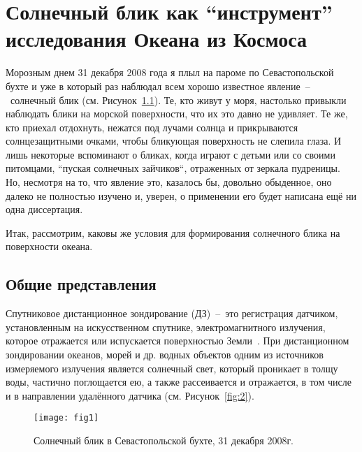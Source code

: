 \chapter{Солнечный блик как ``инструмент'' исследования Океана из Космоса} \label{chap:1}

Морозным днем 31 декабря 2008 года я плыл на пароме по Севастопольской бухте и уже в который раз наблюдал всем хорошо известное явление~--~солнечный блик (см. Рисунок~\ref{fig:1}). Те, кто живут у моря, настолько привыкли наблюдать блики на морской поверхности, что их это давно не удивляет. Те же, кто приехал отдохнуть, нежатся под лучами солнца и прикрываются солнцезащитными очками, чтобы бликующая поверхность не слепила глаза. И лишь некоторые вспоминают о бликах, когда играют с детьми или со своими питомцами, ``пуская солнечных зайчиков``, отраженных от зеркала пудреницы. Но, несмотря на то, что явление это, казалось бы, довольно обыденное, оно далеко не полностью изучено и, уверен, о применении его будет написана ещё ни одна диссертация. 

Итак, рассмотрим, каковы же условия для формирования солнечного блика на поверхности океана.





\section{Общие представления} \label{sec:1.1}


Спутниковое дистанционное зондирование (ДЗ)~--~это регистрация датчиком, установленным на искусственном спутнике, электромагнитного излучения, которое отражается или испускается поверхностью Земли~\citep{Robinson2004}. При дистанционном зондировании океанов, морей и др. водных объектов одним из источников измеряемого излучения является солнечный свет, который проникает в толщу воды, частично поглощается ею, а также рассеивается и отражается, в том числе и в направлении удалённого датчика (см. Рисунок~\ref{fig:2}).



\begin{figure}[!thb]
 \center
 \texttt{[image: fig1]}
 \caption{Солнечный блик в Севастопольской бухте, 31 декабря 2008г.}
 \label{fig:1}
\end{figure}

